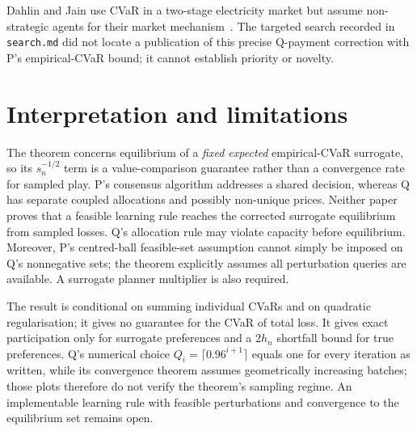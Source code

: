 \documentclass{article}
\begin{document}
Dahlin and Jain use CVaR in a two-stage electricity market but assume non-strategic agents for their market mechanism~\cite{dahlin2020risk}. The targeted search recorded in \texttt{search.md} did not locate a publication of this precise Q-payment correction with P's empirical-CVaR bound; it cannot establish priority or novelty. %

\section{Interpretation and limitations}
The theorem concerns equilibrium of a \emph{fixed expected} empirical-CVaR surrogate, so its \(s_n^{-1/2}\) term is a value-comparison guarantee rather than a convergence rate for sampled play. P's consensus algorithm addresses a shared decision, whereas Q has separate coupled allocations and possibly non-unique prices. Neither paper proves that a feasible learning rule reaches the corrected surrogate equilibrium from sampled losses. Q's allocation rule may violate capacity before equilibrium. Moreover, P's centred-ball feasible-set assumption cannot simply be imposed on Q's nonnegative sets; the theorem explicitly assumes all perturbation queries are available. A surrogate planner multiplier is also required. %

The result is conditional on summing individual CVaRs and on quadratic regularisation; it gives no guarantee for the CVaR of total loss. It gives exact participation only for surrogate preferences and a \(2h_n\) shortfall bound for true preferences. Q's numerical choice \(Q_i=\lceil0.96^{i+1}\rceil\) equals one for every iteration as written, while its convergence theorem assumes geometrically increasing batches; those plots therefore do not verify the theorem's sampling regime. An implementable learning rule with feasible perturbations and convergence to the equilibrium set remains open. %



\end{document}
